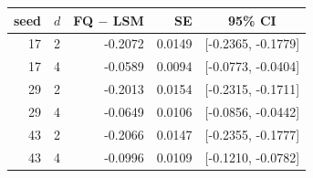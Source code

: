 \begin{tabular}{rlrrc}
\toprule
seed & $d$ & FQ $-$ LSM & SE & 95\% CI \\
\midrule
17 & 2 & -0.2072 & 0.0149 & [-0.2365, -0.1779] \\
17 & 4 & -0.0589 & 0.0094 & [-0.0773, -0.0404] \\
29 & 2 & -0.2013 & 0.0154 & [-0.2315, -0.1711] \\
29 & 4 & -0.0649 & 0.0106 & [-0.0856, -0.0442] \\
43 & 2 & -0.2066 & 0.0147 & [-0.2355, -0.1777] \\
43 & 4 & -0.0996 & 0.0109 & [-0.1210, -0.0782] \\
\bottomrule
\end{tabular}
